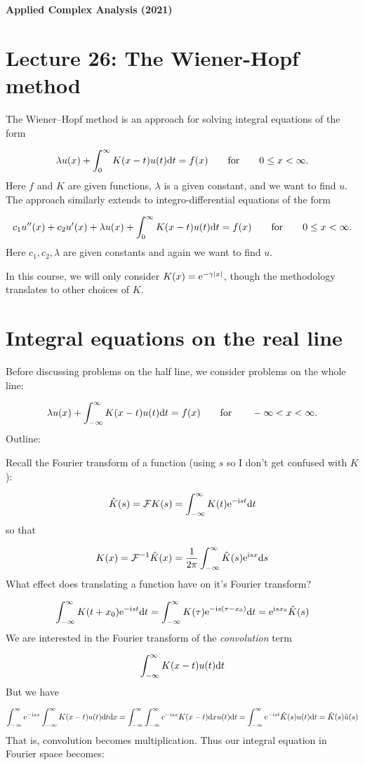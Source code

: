 \documentclass[12pt,landscape]{article}
\def\qqfor{\qquad\hbox{for}\qquad}
\def\D{ {\rm d} }
\def\I{ {\rm i} }
\def\E{ {\rm e} }
\def\dx{\D x}
\def\dt{\D t}
\def\endash{–}
\begin{document}
{\LARGE
\sf
\textbf{Applied Complex Analysis (2021)}

\section{Lecture 26: The Wiener-Hopf method}
The Wiener\ensuremath{\endash}Hopf method is an approach for solving integral equations of the form

\[
\lambda u(x) + \int_0^\infty K(x-t)u(t) \dt = f(x)\qqfor 0 \leq x < \infty.
\]
Here $f$ and $K$ are given functions, $\lambda$ is a given constant, and we want to find $u$. The approach similarly extends to integro-differential equations of the form

\[
c_1 u''(x) + c_2 u'(x) + \lambda u(x) + \int_0^\infty K(x-t)u(t) \dt = f(x)\qqfor 0 \leq x < \infty.
\]
Here $c_1, c_2, \lambda$ are given constants and again we want to find $u$.

In this course, we will only consider $K(x) = \E^{-\gamma |x|}$, though the methodology translates to other choices of $K$.

\section{Integral equations on the real line}
Before discussing problems on the half line, we consider problems on the whole line:

\[
\lambda u(x) + \int_{-\infty}^\infty K(x-t)u(t) \dt = f(x)\qqfor -\infty < x < \infty.
\]
Outline:

Recall the Fourier transform of a function (using $s$ so I don't get confused with $K$):

\[
    {\hat{K}}(s) = {\cal F} K (s) =  \int_{-\infty}^\infty K(t) \E^{-\I s t} \dt
\]
so that

\[
K(x) = {\cal F}^{-1} \hat K(x) =  {1 \over 2\pi}\int_{-\infty}^\infty \hat K(s) \E^{ \I s x} \D s
\]
What effect does translating a function have on it's Fourier transform?

\[
\int_{-\infty}^\infty K(t+x_0) \E^{-\I s t} \dt = \int_{-\infty}^\infty K(\tau) \E^{-\I s (\tau - x_0)} \dt = \E^{\I s x_0} \hat K(s)
\]
We are interested in the  Fourier transform of the \emph{convolution} term

\[
\int_{-\infty}^\infty K(x-t)u(t) \dt
\]
But we have

\[
\int_{-\infty}^\infty \E^{-\I s x} \int_{-\infty}^\infty K(x-t)u(t) \dt \dx = \int_{-\infty}^\infty \int_{-\infty}^\infty \E^{-\I s x} K(x-t)\dx u(t) \dt =
\int_{-\infty}^\infty \E^{-\I s t} \hat K(s) u(t) \dt = \hat K(s) \hat u(s)
\]
That is, convolution becomes multiplication. Thus our integral equation in Fourier space becomes:

}
\end{document}
